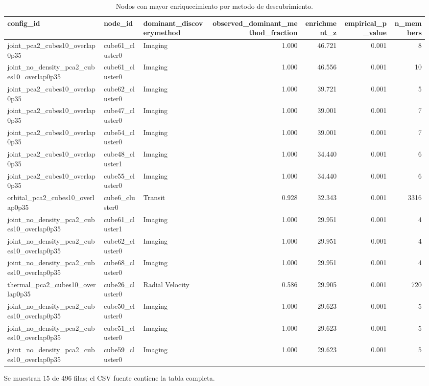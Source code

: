 \begin{table}[H]
\centering
\scriptsize
\caption{Nodos con mayor enriquecimiento por metodo de descubrimiento.}
\label{tab:top_enriched_nodes}
\begin{adjustbox}{max width=\linewidth}
\begin{tabular}{lllrrrr}
\toprule
config\_id & node\_id & dominant\_discoverymethod & observed\_dominant\_method\_fraction & enrichment\_z & empirical\_p\_value & n\_members \\
\midrule
joint\_pca2\_cubes10\_overlap0p35 & cube61\_cluster0 & Imaging & 1.000 & 46.721 & 0.001 & 8 \\
joint\_no\_density\_pca2\_cubes10\_overlap0p35 & cube61\_cluster0 & Imaging & 1.000 & 46.556 & 0.001 & 10 \\
joint\_pca2\_cubes10\_overlap0p35 & cube62\_cluster0 & Imaging & 1.000 & 39.721 & 0.001 & 5 \\
joint\_pca2\_cubes10\_overlap0p35 & cube47\_cluster0 & Imaging & 1.000 & 39.001 & 0.001 & 7 \\
joint\_pca2\_cubes10\_overlap0p35 & cube54\_cluster0 & Imaging & 1.000 & 39.001 & 0.001 & 7 \\
joint\_pca2\_cubes10\_overlap0p35 & cube48\_cluster1 & Imaging & 1.000 & 34.440 & 0.001 & 6 \\
joint\_pca2\_cubes10\_overlap0p35 & cube55\_cluster0 & Imaging & 1.000 & 34.440 & 0.001 & 6 \\
orbital\_pca2\_cubes10\_overlap0p35 & cube6\_cluster0 & Transit & 0.928 & 32.343 & 0.001 & 3316 \\
joint\_no\_density\_pca2\_cubes10\_overlap0p35 & cube61\_cluster1 & Imaging & 1.000 & 29.951 & 0.001 & 4 \\
joint\_no\_density\_pca2\_cubes10\_overlap0p35 & cube62\_cluster0 & Imaging & 1.000 & 29.951 & 0.001 & 4 \\
joint\_no\_density\_pca2\_cubes10\_overlap0p35 & cube68\_cluster0 & Imaging & 1.000 & 29.951 & 0.001 & 4 \\
thermal\_pca2\_cubes10\_overlap0p35 & cube26\_cluster0 & Radial Velocity & 0.586 & 29.905 & 0.001 & 720 \\
joint\_no\_density\_pca2\_cubes10\_overlap0p35 & cube50\_cluster0 & Imaging & 1.000 & 29.623 & 0.001 & 5 \\
joint\_no\_density\_pca2\_cubes10\_overlap0p35 & cube51\_cluster0 & Imaging & 1.000 & 29.623 & 0.001 & 5 \\
joint\_no\_density\_pca2\_cubes10\_overlap0p35 & cube59\_cluster0 & Imaging & 1.000 & 29.623 & 0.001 & 5 \\
\bottomrule
\end{tabular}
\end{adjustbox}
\vspace{0.4em}\begin{minipage}{0.96\linewidth}\footnotesize Se muestran 15 de 496 filas; el CSV fuente contiene la tabla completa.\end{minipage}
\end{table}
